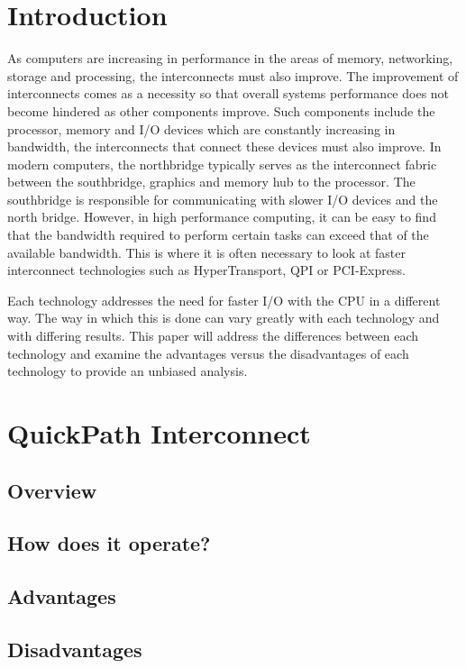 \documentclass[conference]{IEEEtran}
\begin{document}
\section{Introduction}
\label{sec:intro}
As computers are increasing in performance in the areas of memory, networking,
storage and processing, the interconnects must also improve. The improvement of
interconnects comes as a necessity so that overall systems performance does not
become hindered as other components improve. Such components include the
processor, memory and I/O devices which are constantly increasing in bandwidth,
the interconnects that connect these devices must also improve. 
In modern computers, the northbridge typically serves as the interconnect fabric
between the southbridge, graphics and memory hub to the processor. The
southbridge is responsible for communicating with slower I/O devices and the
north bridge. However, in high performance computing, it can be easy to find
that the bandwidth required to perform certain tasks can exceed that of the
available bandwidth. This is where it is often necessary to look at faster
interconnect technologies such as HyperTransport, QPI or PCI-Express. 

Each technology addresses the need for faster I/O with the CPU in a different
way. The way in which this is done can vary greatly with each technology and
with differing results. This paper will address the differences between each
technology and examine the advantages versus the disadvantages of each
technology to provide an unbiased analysis. 

\section{QuickPath Interconnect}
\subsection{Overview}
\subsection{How does it operate?}
\subsection{Advantages}
\subsection{Disadvantages}
\end{document}
